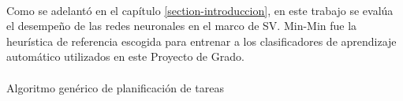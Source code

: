 \paragraph{}Como se adelantó en el capítulo \ref{section-introduccion}, en este trabajo se evalúa el desempeño de las redes neuronales en el marco de SV.
Min-Min fue la heurística de referencia escogida para entrenar a los clasificadores de aprendizaje automático utilizados en este Proyecto de Grado.
 
 
 \paragraph{}
 \SetEndCharOfAlgoLine{}
 \begin{algorithm}[H]
\SetAlgoLined
{}
 \caption{Algoritmo genérico de planificación de tareas} \label{algorithm:planificacion-tareas}
\end{algorithm}